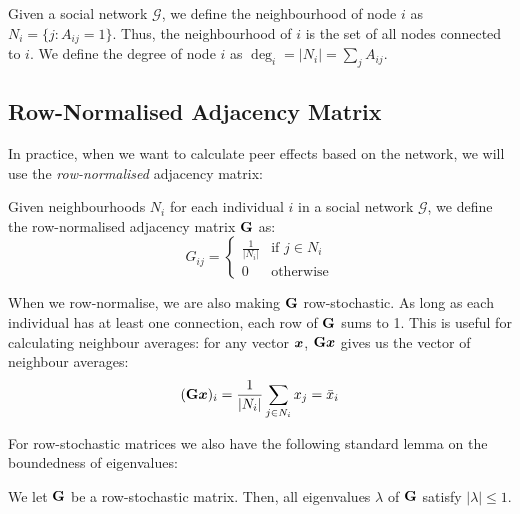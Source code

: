\begin{definition}
Given a social network $\mathcal{G}$, we define the neighbourhood of node $i$ as $N_i = \{j : A_{ij} = 1\}$. Thus, the neighbourhood of $i$ is the set of all nodes connected to $i$. We define the degree of node $i$ as $\deg_i = |N_i| = \sum_j A_{ij}$.
\end{definition}

\subsection{Row-Normalised Adjacency Matrix}

In practice, when we want to calculate peer effects based on the network, we will use the \emph{row-normalised} adjacency matrix:

\begin{definition}
\label{def:row_normalised}
Given neighbourhoods $N_i$ for each individual $i$ in a social network $\mathcal{G}$, we define the row-normalised adjacency matrix $\mathbf{G}$ as:
\begin{equation}
    G_{ij} = \begin{cases}
        \frac{1}{|N_i|} & \text{if } j \in N_i \\
        0 & \text{otherwise}
    \end{cases}
\end{equation}
\end{definition}

When we row-normalise, we are also making $\mathbf{G}$ row-stochastic. As long as each individual has at least one connection, each row of $\mathbf{G}$ sums to 1. This is useful for calculating neighbour averages: for any vector $\bm{x}$, $\mathbf{G}\bm{x}$ gives us the vector of neighbour averages:
\begin{equation}
    (\mathbf{G}\bm{x})_i = \frac{1}{|N_i|} \sum_{j \in N_i} x_j = \bar{x}_i
\end{equation}

For row-stochastic matrices we also have the following standard lemma on the boundedness of eigenvalues:

\begin{lemma}
\label{lem:spectral_radius}
We let $\mathbf{G}$ be a row-stochastic matrix. Then, all eigenvalues $\lambda$ of $\mathbf{G}$ satisfy $|\lambda| \leq 1$.
\end{lemma}

